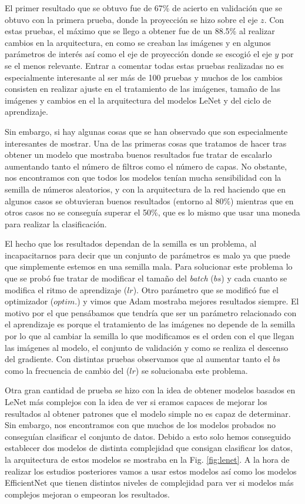 \documentclass[a4paper,12pt,twoside,titlepage]{article}
\begin{document}
El primer resultado que se obtuvo fue de 67\% de acierto en validación que se obtuvo con la primera prueba, donde la proyección se hizo sobre el eje $z$. Con estas pruebas, el máximo que se llego a obtener fue de un 88.5\% al realizar cambios en la arquitectura, en como se creaban las imágenes y en algunos parámetros de interés así como el eje de proyección donde se escogió el eje $y$ por se el menos relevante. Entrar a comentar todas estas pruebas realizadas no es especialmente interesante al ser más de 100 pruebas y muchos de los cambios consisten en realizar ajuste en el tratamiento de las imágenes, tamaño de las imágenes y cambios en el la arquitectura del modelos LeNet y del ciclo de aprendizaje.

Sin embargo, si hay algunas cosas que se han observado que son especialmente interesantes de mostrar. Una de las primeras cosas que tratamos de hacer tras obtener un modelo que mostraba buenos resultados fue tratar de escalarlo aumentando tanto el número de filtros como el número de capas. No obstante, nos encontramos con que todos los modelos tenían mucha sensibilidad con la semilla de números aleatorios, y con la arquitectura de la red haciendo que en algunos casos se obtuvieran buenos resultados (entorno al $80\%$) mientras que en otros casos no se conseguía superar el 50\%, que es lo mismo que usar una moneda para realizar la clasificación. 

El hecho que los resultados dependan de la semilla es un problema, al incapacitarnos para decir que un conjunto de parámetros es malo ya que puede que simplemente estemos en una semilla mala. Para solucionar este problema lo que se probó fue tratar de modificar el tamaño del \textit{batch} ($bs$) y cada cuanto se modifica el ritmo de aprendizaje ($lr$). Otro parámetro que se modificó fue el optimizador ($optim.$) y vimos que Adam mostraba mejores resultados siempre. El motivo por el que pensábamos que tendría que ser un parámetro relacionado con el aprendizaje es porque el tratamiento de las imágenes no depende de la semilla por lo que al cambiar la semilla lo que modificamos es el orden con el que llegan las imágenes al modelo, el conjunto de validación y como se realiza el descenso del gradiente. Con distintas pruebas observamos que al aumentar tanto el $bs$ como la frecuencia de cambio del ($lr$) se solucionaba este problema.

Otra gran cantidad de prueba se hizo con la idea de obtener modelos basados en LeNet más complejos con la idea de ver si eramos capaces de mejorar los resultados al obtener patrones que el modelo simple no es capaz de determinar. Sin embargo, nos encontramos con que muchos de los modelos probados no conseguían clasificar el conjunto de datos. Debido a esto solo hemos conseguido establecer dos modelos de distinta complejidad que consigan clasificar los datos, la arquitectura de estos modelos se mostraba en la Fig. \ref{fig:lenet}. A la hora de realizar los estudios posteriores vamos a usar estos modelos así como los modelos EfficientNet que tienen distintos niveles de complejidad para ver si modelos más complejos mejoran o empeoran los resultados.
\end{document}
